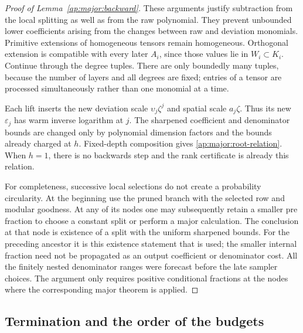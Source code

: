 \begin{proof}[Proof of Lemma~\ref{ap:major:backward}]
These arguments justify subtraction from the local splitting as
well as from the raw polynomial.  They prevent unbounded lower
coefficients arising from the changes between raw and deviation
monomials.  Primitive extensions of homogeneous tensors remain
homogeneous.  Orthogonal extension is compatible with every later
$A_i$, since those values lie in $W_i\subset K_i$.  Continue through
the degree tuples.  There are only boundedly many tuples, because
the number of layers and all degrees are fixed; entries of a tensor
are processed simultaneously rather than one monomial at a time.

Each lift inserts the new deviation scale $\upsilon_j\zeta^j$ and spatial
scale $a_j\zeta$.  Thus its new $\varepsilon_j$ has warm inverse
logarithm at $j$.  The sharpened coefficient and denominator bounds
are changed only by polynomial dimension factors and the bounds
already charged at $h$.  Fixed-depth composition gives
\eqref{ap:major:root-relation}.  When $h=1$, there is no backwards
step and the rank certificate is already this relation.

For completeness, successive local selections do not create a
probability circularity.  At the beginning use the pruned branch
with the selected row and modular goodness.  At any of its nodes
one may subsequently retain a smaller pre fraction to choose a
constant split or perform a major calculation.  The conclusion at
that node is existence of a split with the uniform sharpened bounds.
For the preceding ancestor it is this existence statement that is
used; the smaller internal fraction need not be propagated as an
output coefficient or denominator cost.  All the finitely nested
denominator ranges were forecast before the late sampler choices.
The argument only requires positive conditional fractions at the
nodes where the corresponding major theorem is applied.
\end{proof}

\subsection{Termination and the order of the budgets}

